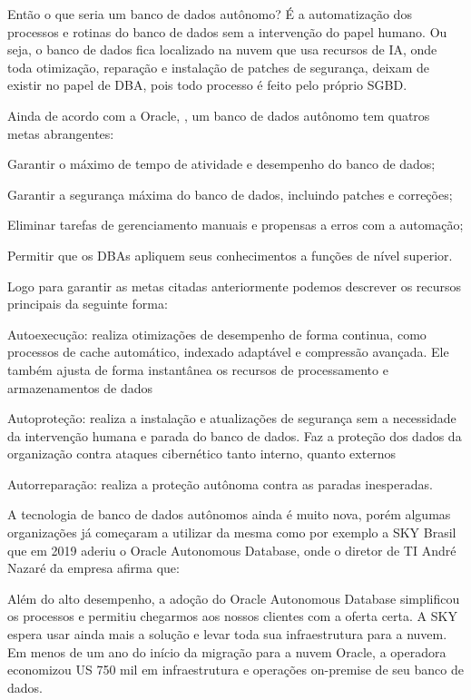 Então o que seria um banco de dados autônomo? É a automatização dos processos e rotinas do banco de dados sem a intervenção do papel humano. Ou seja, o banco de dados fica localizado na nuvem que usa recursos de IA, onde toda otimização, reparação e instalação de patches de segurança, deixam de existir no papel de DBA, pois todo processo é feito pelo próprio SGBD.


Ainda de acordo com a Oracle, \cite{OracleDataBase}, um banco de dados autônomo tem quatros metas abrangentes:
\begin{alineas}
\item Garantir o máximo de tempo de atividade e desempenho do banco de dados;
\item Garantir a segurança máxima do banco de dados, incluindo patches e correções;
\item Eliminar tarefas de gerenciamento manuais e propensas a erros com a automação;
\item Permitir que os DBAs apliquem seus conhecimentos a funções de nível superior.
\end{alineas}


Logo para garantir as metas citadas anteriormente podemos descrever os recursos principais da seguinte forma:

\begin{alineas}
\item Autoexecução: realiza otimizações de desempenho de forma continua, como processos de cache automático, indexado adaptável e compressão avançada. Ele também ajusta de forma instantânea os recursos de processamento e armazenamentos de dados
\item Autoproteção: realiza a instalação e atualizações de segurança sem a necessidade da intervenção humana e parada do banco de dados. Faz a proteção dos dados da organização contra ataques cibernético tanto interno, quanto externos
\item Autorreparação: realiza a proteção autônoma contra as paradas inesperadas.
\end{alineas}


A tecnologia de banco de dados autônomos ainda é muito nova, porém algumas organizações já começaram a utilizar da mesma como por exemplo a SKY Brasil que em 2019 aderiu o Oracle Autonomous Database, onde o diretor de TI André Nazaré da empresa afirma que:  

\begin{citacao}
Além do alto desempenho, a adoção do Oracle Autonomous Database simplificou os processos e permitiu chegarmos aos nossos clientes com a oferta certa. A SKY espera usar ainda mais a solução e levar toda sua infraestrutura para a nuvem. Em menos de um ano do início da migração para a nuvem Oracle, a operadora economizou US 750 mil em infraestrutura e operações on-premise de seu banco de dados.\cite[p. ~34]{Sky}
\end{citacao}


